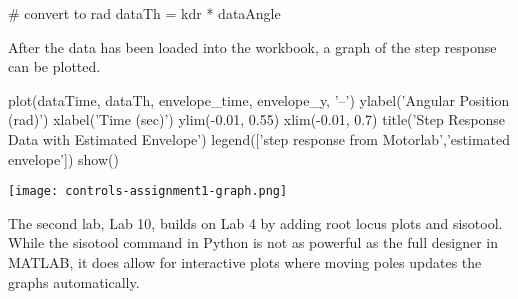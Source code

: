 \begin{tcolorbox}[breakable, enhanced jigsaw, title=ME 570: Assignment \ref{control_assignment_1}, 
    colframe=ksu-purple, colback=ksu-gray]
\begin{python}
# convert to rad
dataTh = kdr * dataAngle
\end{python}

After the data has been loaded into the workbook, a graph of the step
response can be plotted.

\begin{python}
plot(dataTime, dataTh, envelope_time, envelope_y, '--')
ylabel('Angular Position (rad)')
xlabel('Time (sec)')
ylim(-0.01, 0.55)
xlim(-0.01, 0.7)
title('Step Response Data with Estimated Envelope')
legend(['step response from Motorlab','estimated envelope'])
show()
\end{python}

\begin{center}
    \texttt{[image: controls-assignment1-graph.png]}
\end{center}

\end{tcolorbox}

The second lab, Lab 10, builds on Lab 4 by adding root locus plots and sisotool. While the
sisotool command in Python is not as powerful as the full designer in MATLAB, it does allow 
for interactive plots where moving poles updates the graphs automatically. 

\label{control_assignment_2}

